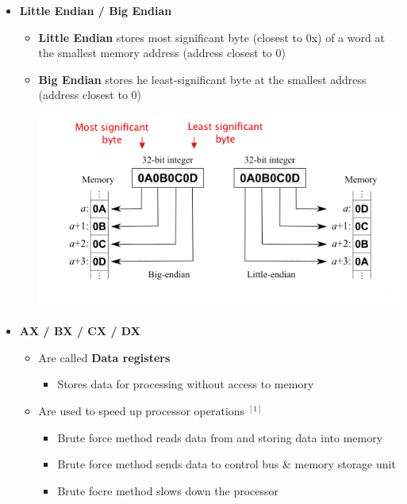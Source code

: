\documentclass[12pt]{article}
\begin{document}
\begin{enumerate}[1.]
\begin{itemize}
\begin{itemize}
\begin{itemize}
            \end{itemize}

            \item \textbf{Little Endian / Big Endian}

            \begin{itemize}
                \item \textbf{Little Endian} stores most significant byte (closest to 0x) of a word at the smallest memory address (address closest to 0)
                \item \textbf{Big Endian} stores he least-significant byte at the smallest address (address closest to 0)

                \bigskip

                \begin{center}
                \includegraphics[width=\linewidth]{images/review_9_solution_12.png}
                \end{center}
            \end{itemize}

            \item \textbf{AX / BX / CX / DX}

            \begin{itemize}
                \item Are called \textbf{Data registers}
                \begin{itemize}
                    \item Stores data for processing without access to memory
                \end{itemize}
                \item Are used to speed up processor operations $^{[1]}$

                \begin{itemize}
                    \item Brute force method reads data from and storing data into memory
                    \item Brute force method sends data to control bus \& memory storage unit
                    \item Brute focre method slows down the processor
                \end{itemize}


\end{itemize}
\end{itemize}
\end{itemize}
\end{enumerate}
\end{document}
